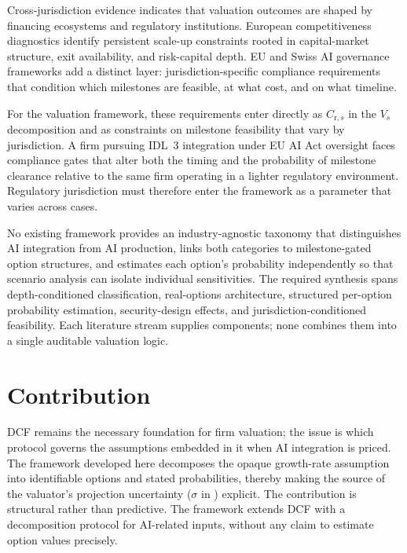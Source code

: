 \documentclass[oneside,10pt]{swissi}
\begin{document}
Cross-jurisdiction evidence indicates that valuation outcomes are shaped by financing ecosystems and regulatory institutions. European competitiveness diagnostics identify persistent scale-up constraints rooted in capital-market structure, exit availability, and risk-capital depth.\cite{draghi2024competitiveness,arnold2024steppingup} EU and Swiss AI governance frameworks add a distinct layer: jurisdiction-specific compliance requirements that condition which milestones are feasible, at what cost, and on what timeline.\cite{eu2024aiact,finma2024guidance08,bakom2025aiapproach}

For the valuation framework, these requirements enter directly as $C_{\mathrm{r},s}$ in the $V_s$ decomposition and as constraints on milestone feasibility that vary by jurisdiction. A firm pursuing IDL~3 integration under EU AI Act oversight faces compliance gates that alter both the timing and the probability of milestone clearance relative to the same firm operating in a lighter regulatory environment. Regulatory jurisdiction must therefore enter the framework as a parameter that varies across cases.

No existing framework provides an industry-agnostic taxonomy that distinguishes AI integration from AI production, links both categories to milestone-gated option structures, and estimates each option's probability independently so that scenario analysis can isolate individual sensitivities. The required synthesis spans depth-conditioned classification, real-options architecture, structured per-option probability estimation, security-design effects, and jurisdiction-conditioned feasibility. Each literature stream supplies components; none combines them into a single auditable valuation logic.

\section{Contribution}

DCF remains the necessary foundation for firm valuation; the issue is which protocol governs the assumptions embedded in it when AI integration is priced. The framework developed here decomposes the opaque growth-rate assumption into identifiable options and stated probabilities, thereby making the source of the valuator's projection uncertainty ($\sigma$ in ) explicit. The contribution is structural rather than predictive. The framework extends DCF with a decomposition protocol for AI-related inputs, without any claim to estimate option values precisely.
\end{document}
